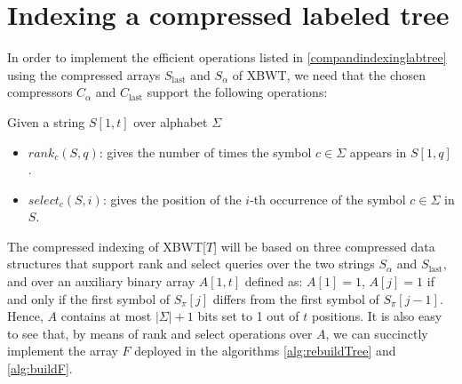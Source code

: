 \section{Indexing a compressed labeled tree}
In order to implement the efficient operations listed in \ref{compandindexinglabtree} using the compressed arrays $S_{\text{last}}$ and $S_{\alpha}$ of XBWT, we need that the chosen compressors $C_{\alpha}$ and $C_{\text{last}}$ support the following operations:

Given a string $S[1, t]$ over alphabet $\Sigma$
\begin{itemize}
    \item \textbf{$rank_c(S, q)$}: gives the number of times the symbol $c \in \Sigma$ appears in $S[1, q]$.
    \item \textbf{$select_c(S, i)$}: gives the position of the $i$-th occurrence of the symbol $c \in \Sigma$ in $S$.
\end{itemize}

The compressed indexing of XBWT[$T$] will be based on three compressed data structures that support rank and select queries over the two strings $S_{\alpha}$ and $S_{\text{last}}$, and over an auxiliary binary array $A[1, t]$ defined as: $A[1] = 1$, $A[j] = 1$ if and only if the first symbol of $S_{\pi}[j]$ differs from the first symbol of $S_{\pi}[j - 1]$. Hence, $A$ contains at most $|\Sigma| + 1$ bits set to 1 out of $t$ positions. It is also easy to see that, by means of rank and select operations over $A$, we can succinctly implement the array $F$ deployed in the algorithms \ref{alg:rebuildTree} and \ref{alg:buildF}.

